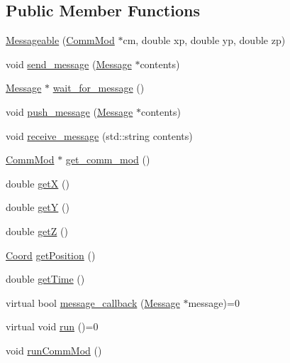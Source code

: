 \subsection*{Public Member Functions}
\begin{DoxyCompactItemize}
\item 
\hyperlink{class_messageable_a17da78cfa69fc760ece179365de9ef23}{Messageable} (\hyperlink{class_comm_mod}{Comm\+Mod} $\ast$cm, double xp, double yp, double zp)
\item 
void \hyperlink{class_messageable_aaadfd99f6f7a1ec8c8195232a48e3b15}{send\+\_\+message} (\hyperlink{class_message}{Message} $\ast$contents)
\item 
\hyperlink{class_message}{Message} $\ast$ \hyperlink{class_messageable_acca6e0ec0f301179e9bf5596b5b7d9a7}{wait\+\_\+for\+\_\+message} ()
\item 
void \hyperlink{class_messageable_a778d44d8365ed5927bf237d331593809}{push\+\_\+message} (\hyperlink{class_message}{Message} $\ast$contents)
\item 
void \hyperlink{class_messageable_a5e581d6cf3383931bb4749bbbe4d81ee}{receive\+\_\+message} (std\+::string contents)
\item 
\hyperlink{class_comm_mod}{Comm\+Mod} $\ast$ \hyperlink{class_messageable_a600102c71a3398e1ffe181c3e4e680a0}{get\+\_\+comm\+\_\+mod} ()
\item 
double \hyperlink{class_messageable_a95b2cc2dc0f0b5133cf490472b2b13bb}{getX} ()
\item 
double \hyperlink{class_messageable_a202416adb2413f9b5bc33c64ec2bc12e}{getY} ()
\item 
double \hyperlink{class_messageable_a7da3f0e2540087aa8933ec4cd99789ce}{getZ} ()
\item 
\hyperlink{struct_coord}{Coord} \hyperlink{class_messageable_a7f990ea00748e817ef7a20dd9ab8e88c}{get\+Position} ()
\item 
double \hyperlink{class_messageable_a695c9311c6ece88dd81ec325d24dc01e}{get\+Time} ()
\item 
virtual bool \hyperlink{class_messageable_adda0d24929a929b9d91c97da1fb91775}{message\+\_\+callback} (\hyperlink{class_message}{Message} $\ast$message)=0
\item 
virtual void \hyperlink{class_messageable_a82c2308b9fabe8e06664d17b3c018b75}{run} ()=0
\item 
void \hyperlink{class_messageable_ab39d542fbac3744a22161efbe0dc9ff7}{run\+Comm\+Mod} ()
\end{DoxyCompactItemize}
